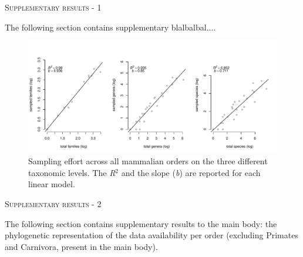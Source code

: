 \documentclass[12pt,letterpaper]{article}
\renewcommand{\section}[1]{%
\bigskip
\begin{center}
\begin{Large}
\normalfont\scshape #1
\medskip
\end{Large}
\end{center}}
\begin{document}
\section{Supplementary results - 1}
The following section contains supplementary blalbalbal....

\begin{figure}[!htbp]
\centering
    \includegraphics[width=1\textwidth]{Supp_figure_sampling_effort.pdf}
\caption{Sampling effort across all mammalian orders on the three different taxonomic levels. The \textit{R$^2$} and the slope (\textit{b}) are reported for each linear model.}
\label{Supp_Figure_sampling}
\end{figure}

\newpage

\section{Supplementary results - 2}
The following section contains supplementary results to the main body: the phylogenetic representation of the data availability per order (excluding Primates and Carnivora, present in the main body).
\end{document}
